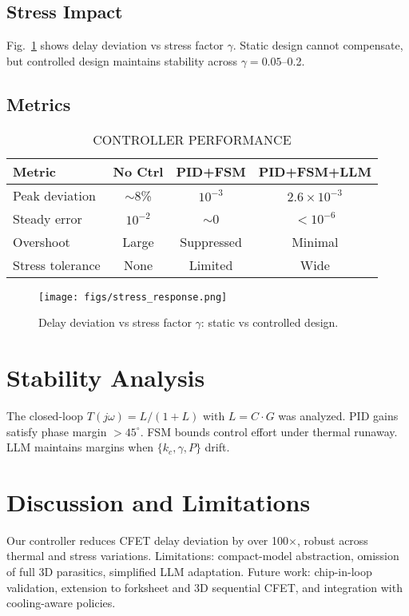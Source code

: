 \documentclass[conference]{IEEEtran}
\begin{document}
\subsection{Stress Impact}
Fig.~\ref{fig:stress} shows delay deviation vs stress factor $\gamma$. Static design cannot compensate, but controlled design maintains stability across $\gamma=0.05$--0.2.

\subsection{Metrics}
\begin{table}[b]
\renewcommand{\arraystretch}{1.1}
\caption{CONTROLLER PERFORMANCE}
\centering
\begin{tabular}{|l|c|c|c|}
\hline
Metric & No Ctrl & PID+FSM & PID+FSM+LLM \\
\hline
Peak deviation & $\sim$8\% & $10^{-3}$ & $2.6\times 10^{-3}$ \\
Steady error   & $10^{-2}$ & $\sim$0   & $<10^{-6}$ \\
Overshoot      & Large     & Suppressed & Minimal \\
Stress tolerance & None    & Limited   & Wide \\
\hline
\end{tabular}
\end{table}

\begin{figure}[t]
\centering
\texttt{[image: figs/stress\_response.png]}
\caption{Delay deviation vs stress factor $\gamma$: static vs controlled design.}
\label{fig:stress}
\end{figure}

\section{Stability Analysis}
The closed-loop $T(j\omega)=L/(1+L)$ with $L=C\cdot G$ was analyzed. PID gains satisfy phase margin $>45^\circ$. FSM bounds control effort under thermal runaway. LLM maintains margins when $\{k_c,\gamma,P\}$ drift.

\section{Discussion and Limitations}
Our controller reduces CFET delay deviation by over 100$\times$, robust across thermal and stress variations. Limitations: compact-model abstraction, omission of full 3D parasitics, simplified LLM adaptation. Future work: chip-in-loop validation, extension to forksheet and 3D sequential CFET, and integration with cooling-aware policies.
\end{document}
